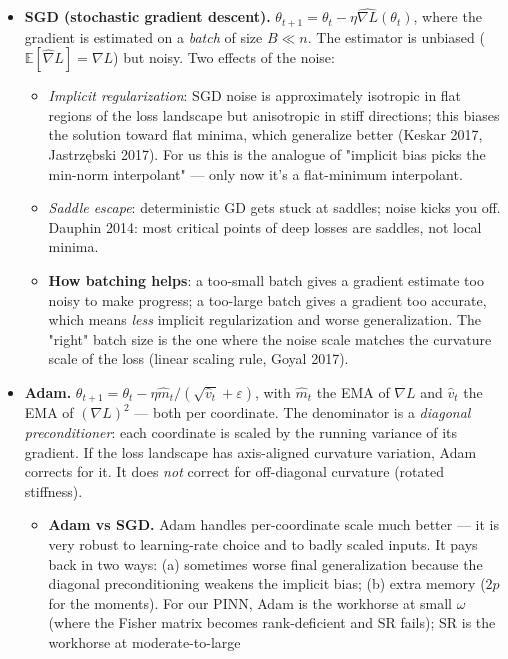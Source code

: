 \documentclass[11pt]{article}
\begin{document}
\begin{itemize}
\item \textbf{SGD (stochastic gradient descent).} $\theta_{t+1} = \theta_t - \eta
  \widehat{\nabla L}(\theta_t)$, where the gradient is estimated on a
\emph{batch} of size $B \ll n$. The estimator is unbiased ($\mathbb E[\hat
  \nabla L] = \nabla L$) but noisy. Two effects of the noise:
\begin{itemize}
\item \emph{Implicit regularization}: SGD noise is approximately isotropic in
flat regions of the loss landscape but anisotropic in stiff
directions; this biases the solution toward flat minima, which
generalize better (Keskar 2017, Jastrz\k{e}bski 2017). For us this is the
analogue of "implicit bias picks the min-norm interpolant" --- only now
it's a flat-minimum interpolant.
\item \emph{Saddle escape}: deterministic GD gets stuck at saddles; noise kicks
you off. Dauphin 2014: most critical points of deep losses are
saddles, not local minima.
\item \textbf{How batching helps}: a too-small batch gives a gradient estimate
too noisy to make progress; a too-large batch gives a gradient too
accurate, which means \emph{less} implicit regularization and worse
generalization. The "right" batch size is the one where the noise
scale matches the curvature scale of the loss (linear scaling rule,
Goyal 2017).
\end{itemize}
\item \textbf{Adam.} $\theta_{t+1} = \theta_t - \eta \hat m_t / (\sqrt{\hat v_t} +
  \varepsilon)$, with $\hat m_t$ the EMA of $\nabla L$ and $\hat v_t$ the
EMA of $(\nabla L)^2$ --- both per coordinate. The denominator is a
\emph{diagonal preconditioner}: each coordinate is scaled by the running
variance of its gradient. If the loss landscape has axis-aligned
curvature variation, Adam corrects for it. It does \emph{not} correct for
off-diagonal curvature (rotated stiffness).
\begin{itemize}
\item \textbf{Adam vs SGD.} Adam handles per-coordinate scale much better --- it is
very robust to learning-rate choice and to badly scaled inputs. It
pays back in two ways: (a) sometimes worse final generalization
because the diagonal preconditioning weakens the implicit bias; (b)
extra memory ($2p$ for the moments). For our PINN, Adam is the
workhorse at small $\omega$ (where the Fisher matrix becomes
rank-deficient and SR fails); SR is the workhorse at moderate-to-large

\end{itemize}
\end{itemize}
\end{document}
